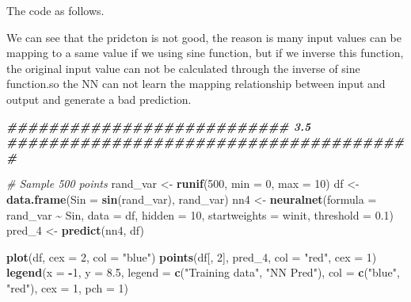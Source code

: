 \documentclass[
]{article}
\newenvironment{Shaded}{\begin{snugshade}}{\end{snugshade}}
\newcommand{\AttributeTok}[1]{\textcolor[rgb]{0.13,0.29,0.53}{#1}}
\newcommand{\CommentTok}[1]{\textcolor[rgb]{0.56,0.35,0.01}{\textit{#1}}}
\newcommand{\DecValTok}[1]{\textcolor[rgb]{0.00,0.00,0.81}{#1}}
\newcommand{\DocumentationTok}[1]{\textcolor[rgb]{0.56,0.35,0.01}{\textbf{\textit{#1}}}}
\newcommand{\FloatTok}[1]{\textcolor[rgb]{0.00,0.00,0.81}{#1}}
\newcommand{\FunctionTok}[1]{\textcolor[rgb]{0.13,0.29,0.53}{\textbf{#1}}}
\newcommand{\NormalTok}[1]{#1}
\newcommand{\OtherTok}[1]{\textcolor[rgb]{0.56,0.35,0.01}{#1}}
\newcommand{\SpecialCharTok}[1]{\textcolor[rgb]{0.81,0.36,0.00}{\textbf{#1}}}
\newcommand{\StringTok}[1]{\textcolor[rgb]{0.31,0.60,0.02}{#1}}
\begin{document}
The code as follows.

We can see that the pridcton is not good, the reason is many input
values can be mapping to a same value if we using sine function, but if
we inverse this function, the original input value can not be calculated
through the inverse of sine function.so the NN can not learn the mapping
relationship between input and output and generate a bad prediction.

\begin{Shaded}
\begin{Highlighting}[]
\DocumentationTok{\#\#\#\#\#\#\#\#\#\#\#\#\#\#\#\#\#\#\#\#\#\#\#\#\#\#\#  3.5  \#\#\#\#\#\#\#\#\#\#\#\#\#\#\#\#\#\#\#\#\#\#\#\#\#\#\#\#\#\#\#\#\#\#\#\#\#\#\#}

\CommentTok{\# Sample 500 points}
\NormalTok{rand\_var }\OtherTok{\textless{}{-}} \FunctionTok{runif}\NormalTok{(}\DecValTok{500}\NormalTok{, }\AttributeTok{min =} \DecValTok{0}\NormalTok{, }\AttributeTok{max =} \DecValTok{10}\NormalTok{) }
\NormalTok{df }\OtherTok{\textless{}{-}} \FunctionTok{data.frame}\NormalTok{(}\AttributeTok{Sin =} \FunctionTok{sin}\NormalTok{(rand\_var), rand\_var)}
\NormalTok{nn4 }\OtherTok{\textless{}{-}} \FunctionTok{neuralnet}\NormalTok{(}\AttributeTok{formula =}\NormalTok{ rand\_var }\SpecialCharTok{\textasciitilde{}}\NormalTok{ Sin, }\AttributeTok{data =}\NormalTok{ df, }\AttributeTok{hidden =} \DecValTok{10}\NormalTok{, }\AttributeTok{startweights =}\NormalTok{ winit, }\AttributeTok{threshold =} \FloatTok{0.1}\NormalTok{)}
\NormalTok{pred\_4 }\OtherTok{\textless{}{-}} \FunctionTok{predict}\NormalTok{(nn4, df)}

\FunctionTok{plot}\NormalTok{(df, }\AttributeTok{cex =} \DecValTok{2}\NormalTok{, }\AttributeTok{col =} \StringTok{"blue"}\NormalTok{)}
\FunctionTok{points}\NormalTok{(df[, }\DecValTok{2}\NormalTok{], pred\_4, }\AttributeTok{col =} \StringTok{"red"}\NormalTok{, }\AttributeTok{cex =} \DecValTok{1}\NormalTok{)}
\FunctionTok{legend}\NormalTok{(}\AttributeTok{x =} \SpecialCharTok{{-}}\DecValTok{1}\NormalTok{, }\AttributeTok{y =} \FloatTok{8.5}\NormalTok{, }\AttributeTok{legend =} \FunctionTok{c}\NormalTok{(}\StringTok{"Training data"}\NormalTok{, }\StringTok{"NN Pred"}\NormalTok{),}
\AttributeTok{col =} \FunctionTok{c}\NormalTok{(}\StringTok{"blue"}\NormalTok{, }\StringTok{"red"}\NormalTok{), }\AttributeTok{cex =} \DecValTok{1}\NormalTok{, }\AttributeTok{pch =} \DecValTok{1}\NormalTok{)}
\end{Highlighting}
\end{Shaded}
\end{document}
